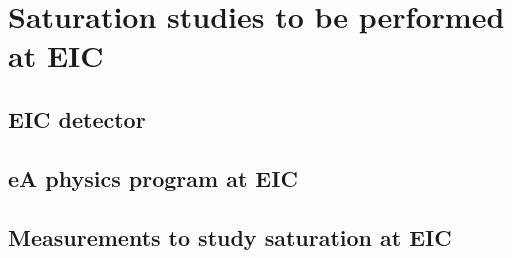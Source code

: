 \chapter{Saturation studies to be performed at EIC} \label{chp:EIC}

\section{EIC detector}

\section{eA physics program at EIC}

\section{Measurements to study saturation at EIC}